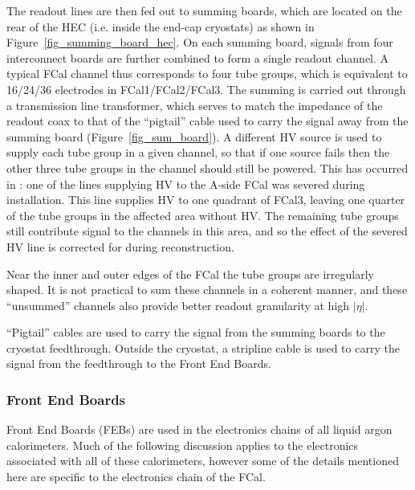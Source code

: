 The readout lines are then fed out to summing boards, which are located on the rear of the HEC (i.e. inside the end-cap cryostats) as shown in Figure~\ref{fig_summing_board_hec}. On each summing board, signals from four interconnect boards are further combined to form a single readout channel. A typical FCal channel thus corresponds to four tube groups, which is equivalent to 16/24/36 electrodes in FCal1/FCal2/FCal3. The summing is carried out through a transmission line transformer, which serves to match the impedance of the readout coax to that of the ``pigtail'' cable used to carry the signal away from the summing board (Figure~\ref{fig_sum_board}). A different HV source is used to supply each tube group in a given channel, so that if one source fails then the other three tube groups in the channel should still be powered. This has occurred in \atlas: one of the lines supplying HV to the A-side FCal was severed during installation. This line supplies HV to one quadrant of FCal3, leaving one quarter of the tube groups in the affected area without HV. The remaining tube groups still contribute signal to the channels in this area, and so the effect of the severed HV line is corrected for during reconstruction.

Near the inner and outer edges of the FCal the tube groups are irregularly shaped. It is not practical to sum these channels in a coherent manner, and these ``unsummed'' channels also provide better readout granularity at high $|\eta|$.  


``Pigtail'' cables are  used to carry the signal from the summing boards to the cryostat feedthrough. Outside the cryostat, a stripline cable is used to carry the signal from the feedthrough to the Front End Boards.

\subsubsection{Front End Boards}
\label{sec_FEB}
Front End Boards (FEBs)\cite{ATLAS_FEB_design} are used in the electronics chains of all liquid argon calorimeters. Much of the following discussion applies to the electronics associated with all of these calorimeters, however some of the details mentioned here are specific to the electronics chain of the FCal. 

